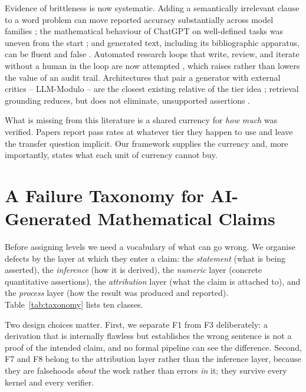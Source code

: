 \documentclass[11pt]{article}
\theoremstyle{plain}
\theoremstyle{definition}
\begin{document}
Evidence of brittleness is now systematic. Adding a semantically irrelevant clause to a word
problem can move reported accuracy substantially across model families
\citep{mirzadeh2024gsmsymbolic}; the mathematical behaviour of ChatGPT on well-defined tasks
was uneven from the start \citep{frieder2023chatgpt}; and generated text, including its
bibliographic apparatus, can be fluent and false \citep{ji2023hallucination}. Automated
research loops that write, review, and iterate without a human in the loop are now attempted
\citep{lu2024aiscientist}, which raises rather than lowers the value of an audit trail.
Architectures that pair a generator with external critics -- LLM-Modulo -- are the closest
existing relative of the tier idea \citep{kambhampati2024llmmodulo}; retrieval grounding
reduces, but does not eliminate, unsupported assertions \citep{lewis2020rag}.

What is missing from this literature is a shared currency for \emph{how much} was verified.
Papers report pass rates at whatever tier they happen to use and leave the transfer question
implicit. Our framework supplies the currency and, more importantly, states what each unit of
currency cannot buy.

\section{A Failure Taxonomy for AI-Generated Mathematical Claims}
\label{sec:taxonomy}

Before assigning levels we need a vocabulary of what can go wrong. We organise defects by the
layer at which they enter a claim: the \emph{statement} (what is being asserted), the
\emph{inference} (how it is derived), the \emph{numeric} layer (concrete quantitative
assertions), the \emph{attribution} layer (what the claim is attached to), and the
\emph{process} layer (how the result was produced and reported). Table~\ref{tab:taxonomy}
lists ten classes.

Two design choices matter. First, we separate F1 from F3 deliberately: a derivation that is
internally flawless but establishes the wrong sentence is not a proof of the intended claim,
and no formal pipeline can see the difference. Second, F7 and F8 belong to the attribution
layer rather than the inference layer, because they are falsehoods \emph{about} the work
rather than errors \emph{in} it; they survive every kernel and every verifier.
\end{document}
